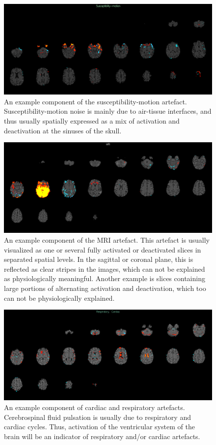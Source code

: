 \begin{figure}[H]                 
	\includegraphics[width=.85\textwidth]{figures/bMethods/Susceptibility_motion}  
	\caption{An example component of the susceptibility-motion artefact. Susceptibility-motion noise is mainly due to air-tissue interfaces, and thus usually spatially expressed as a mix of activation and deactivation at the sinuses of the skull.}
	\label{fig:meth:sus} 
\end{figure}

\begin{figure}[H]                 
	\includegraphics[width=.85\textwidth]{figures/bMethods/MRI}  
	\caption{An example component of the MRI artefact. This artefact is usually visualized as one or several fully activated or deactivated slices in separated spatial levels. In the sagittal or coronal plane, this is reflected as clear stripes in the images, which can not be explained as physiologically meaningful. Another example is slices containing large portions of alternating activation and deactivation, which too can not be physiologically explained.}
	\label{fig:meth:MRI} 
\end{figure}

\begin{figure}[H]                 
	\includegraphics[width=.85\textwidth]{figures/bMethods/card_resp}  
	\caption{An example component of cardiac and respiratory artefacts. Cerebrospinal fluid pulsation is usually due to respiratory and cardiac cycles. Thus, activation of the ventricular system of the brain will be an indicator of respiratory and/or cardiac artefacts.}
	\label{fig:meth:phys} 
\end{figure}


